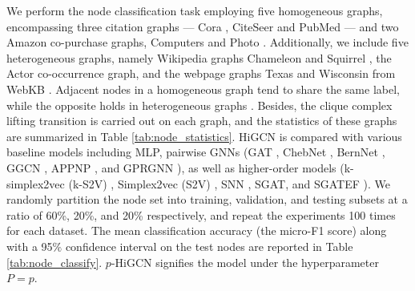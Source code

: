 \documentclass[letterpaper]{article} \usepackage{aaai24}
\theoremstyle{plain}
\theoremstyle{definition}
\theoremstyle{remark}
\begin{document}
We perform the node classification task employing five homogeneous graphs, encompassing three citation graphs — Cora \cite{mccallum2000automating}, CiteSeer and PubMed \cite{Yang2016CiteGraph} — and two Amazon co-purchase graphs, Computers and Photo \cite{Shchur2018}. 
Additionally, we include five heterogeneous graphs, namely Wikipedia graphs Chameleon and Squirrel \cite{Rozemberczki2021}, the Actor co-occurrence graph, and the webpage graphs Texas and Wisconsin from WebKB \cite{Pei2020Geom-GCN}.
Adjacent nodes in a homogeneous graph tend to share the same label, while the opposite holds in heterogeneous graphs \cite{homo2020}. 
Besides, the clique complex lifting transition is carried out on each graph, and the statistics of these graphs are summarized in Table \ref{tab:node_statistics}.
HiGCN is compared with various baseline models including MLP, pairwise GNNs (GAT \cite{GAT2018}, ChebNet \cite{ChebNet}, BernNet \cite{BernNet}, GGCN \cite{GGCN}, APPNP \cite{APPNP}, and GPRGNN \cite{GPRGNN}), as well as higher-order models (k-simplex2vec (k-S2V) \cite{k-simplex2vec}, Simplex2vec (S2V) \cite{Simplex2vec}, SNN \cite{SNN2020}, SGAT, and SGATEF \cite{SGAT}). 
We randomly partition the node set into training, validation, and testing subsets at a ratio of 60\%, 20\%, and 20\% respectively, and repeat the experiments 100 times for each dataset. 
The mean classification accuracy (the micro-F1 score) along with a 95$\%$ confidence interval on the test nodes are reported in Table \ref{tab:node_classify}.
$p$-HiGCN signifies the model under the hyperparameter $P=p$. 
\end{document}
